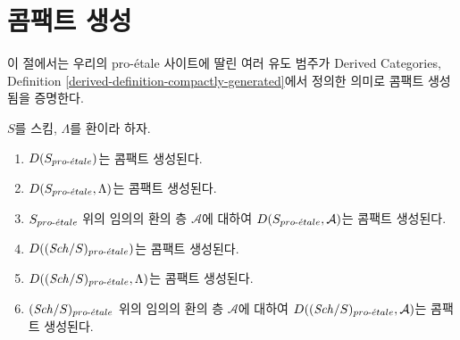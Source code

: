 \section{콤팩트 생성}
\label{section-compact-generation}

\noindent
이 절에서는 우리의 pro-\'etale 사이트에 딸린 여러 유도 범주가
Derived Categories, Definition
\ref{derived-definition-compactly-generated}에서 정의한 의미로 콤팩트
생성됨을 증명한다.

\begin{lemma}
\label{lemma-enough-compact-proetale}
$S$를 스킴, $\Lambda$를 환이라 하자.
\begin{enumerate}
\item $D(S_{pro\text{-}\acute{e}tale})$는 콤팩트 생성된다.
\item $D(S_{pro\text{-}\acute{e}tale}, \Lambda)$는 콤팩트 생성된다.
\item $S_{pro\text{-}\acute{e}tale}$ 위의 임의의 환의 층 $\mathcal{A}$에 대하여
$D(S_{pro\text{-}\acute{e}tale}, \mathcal{A})$는 콤팩트 생성된다.
\item $D((\mathit{Sch}/S)_{pro\text{-}\acute{e}tale})$는 콤팩트 생성된다.
\item $D((\mathit{Sch}/S)_{pro\text{-}\acute{e}tale}, \Lambda)$는 콤팩트 생성된다.
\item $(\mathit{Sch}/S)_{pro\text{-}\acute{e}tale}$ 위의 임의의 환의 층 $\mathcal{A}$에 대하여
$D((\mathit{Sch}/S)_{pro\text{-}\acute{e}tale}, \mathcal{A})$는 콤팩트 생성된다.
\end{enumerate}
\end{lemma}


